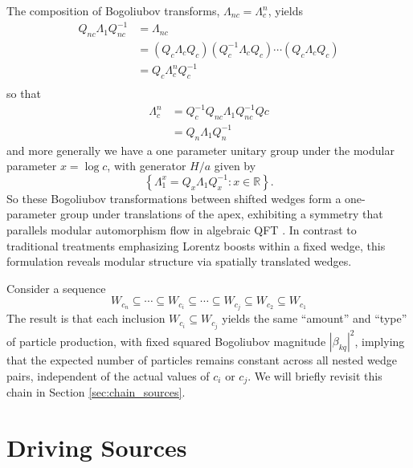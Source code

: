 \documentclass[12pt,a4paper]{article}
\begin{document}
The composition of Bogoliubov transforms, $\Lambda_{nc} = \Lambda_c^n$, yields
\begin{equation}
  \begin{array}{ll}    
    Q_{nc} \Lambda_1 Q_{nc}^{-1}  &= \Lambda_{nc} \\
         &= \left(Q_c \Lambda_{c} Q_c\right) \left( Q_c^{-1} \Lambda_{c} Q_c\right) \cdots \left(Q_c \Lambda_{c} Q_c\right) \\
  &= Q_c \Lambda_c^n Q_c^{-1} \\
  \end{array}
\end{equation}
so that
\begin{equation}
  \begin{array}{ll}
  \Lambda_c^n &= Q_c^{-1} Q_{nc} \Lambda_1 Q_{nc}^{-1} Q{c} \\
  &= Q_n \Lambda_1 Q_n^{-1}
  \end{array}
\end{equation}
and more generally we have a one parameter unitary group under the modular parameter $x = \log c$, with generator $H/a$ given by
\begin{equation}
  \left\{\Lambda_1^x = Q_x \Lambda_1 Q_x^{-1} : x \in \mathbb{R} \right\}.
\end{equation}
So these Bogoliubov transformations between shifted wedges form a one-parameter group under translations of the apex, exhibiting a symmetry that parallels modular automorphism flow in algebraic QFT \cite{borchers2000revolutionizing}. In contrast to traditional treatments emphasizing Lorentz boosts within a fixed wedge, this formulation reveals modular structure via spatially translated wedges.

Consider a sequence
\begin{equation}
  W_{c_n} \subseteq \cdots \subseteq W_{c_i} \subseteq \cdots \subseteq W_{c_j} \subseteq W_{c_2} \subseteq W_{c_1}
  \label{chain}
\end{equation}
The result is that each inclusion $W_{c_i} \subseteq W_{c_j}$ yields the same ``amount'' and ``type'' of particle production, with fixed squared Bogoliubov magnitude $|\beta_{kq}|^2$, implying that the expected number of particles remains constant across all nested wedge pairs, independent of the actual values of $c_i$ or $c_j$.  We will briefly revisit this chain in Section \ref{sec:chain_sources}.

\section{Driving Sources} \label{sec:drive}
\end{document}
